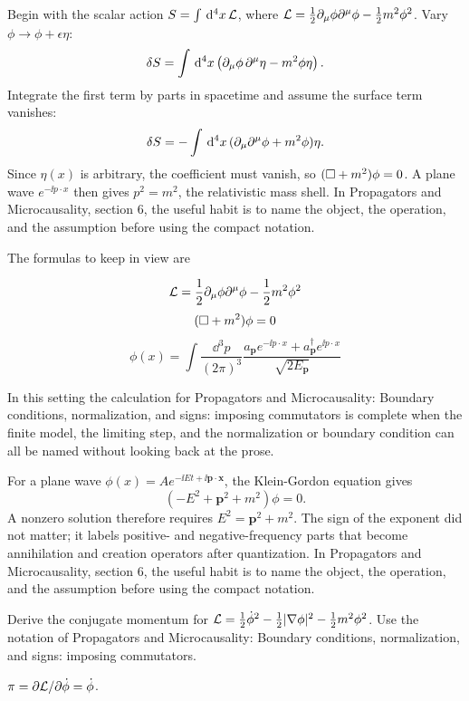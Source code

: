 Begin with the scalar action \(S=\int\,\mathrm d^4x\,\mathcal L\), where \(\mathcal L=\frac12\partial_\mu\phi\partial^\mu\phi-\frac12m^2\phi^2\).  Vary \(\phi\to\phi+\epsilon\eta\):
\[
  \delta S=\int\,\mathrm d^4x\left(\partial_\mu\phi\,\partial^\mu\eta-m^2\phi\eta\right).
\]
Integrate the first term by parts in spacetime and assume the surface term vanishes:
\[
  \delta S=-\int\,\mathrm d^4x\,(\partial_\mu\partial^\mu\phi+m^2\phi)\eta.
\]
Since \(\eta(x)\) is arbitrary, the coefficient must vanish, so \((\Box+m^2)\phi=0\).  A plane wave \(e^{-\ii p\cdot x}\) then gives \(p^2=m^2\), the relativistic mass shell.  In Propagators and Microcausality, section 6, the useful habit is to name the object, the operation, and the assumption before using the compact notation.

The formulas to keep in view are

\[
  \mathcal L=\frac12\partial_\mu\phi\partial^\mu\phi-\frac12m^2\phi^2
\]
\[
  (\Box+m^2)\phi=0
\]
\[
  \phi(x)=\int\frac{\dd^3p}{(2\pi)^3}\frac{a_{\bm p}e^{-\ii p\cdot x}+a_{\bm p}^\dagger e^{\ii p\cdot x}}{\sqrt{2E_{\bm p}}}
\]

In this setting the calculation for Propagators and Microcausality: Boundary conditions, normalization, and signs: imposing commutators is complete when the finite model, the limiting step, and the normalization or boundary condition can all be named without looking back at the prose.




\begin{example}
For a plane wave \(\phi(x)=Ae^{-\ii Et+\ii\bm p\cdot\bm x}\), the Klein-Gordon equation gives
\[
  (-E^2+\bm p^2+m^2)\phi=0.
\]
A nonzero solution therefore requires \(E^2=\bm p^2+m^2\).  The sign of the exponent did not matter; it labels positive- and negative-frequency parts that become annihilation and creation operators after quantization.  In Propagators and Microcausality, section 6, the useful habit is to name the object, the operation, and the assumption before using the compact notation.
\end{example}



\begin{exercise}
Derive the conjugate momentum for \(\mathcal L=\frac12\dot\phi^2-\frac12|\nabla\phi|^2-\frac12m^2\phi^2\).  Use the notation of Propagators and Microcausality: Boundary conditions, normalization, and signs: imposing commutators.
\begin{answer}
\(\pi=\partial\mathcal L/\partial\dot\phi=\dot\phi\).
\end{answer}
\end{exercise}

